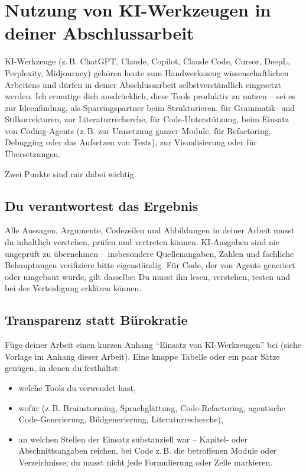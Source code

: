 \chapter{Nutzung von KI-Werkzeugen in deiner Abschlussarbeit}
\label{chap:ki-werkzeuge}

KI-Werkzeuge (z.\,B. ChatGPT, Claude, Copilot, Claude Code, Cursor, DeepL, Perplexity, Midjourney) gehören heute zum Handwerkszeug wissenschaftlichen Arbeitens und dürfen in deiner Abschlussarbeit selbstverständlich eingesetzt werden. Ich ermutige dich ausdrücklich, diese Tools produktiv zu nutzen -- sei es zur Ideenfindung, als Sparringspartner beim Strukturieren, für Grammatik- und Stilkorrekturen, zur Literaturrecherche, für Code-Unterstützung, beim Einsatz von Coding-Agents (z.\,B. zur Umsetzung ganzer Module, für Refactoring, Debugging oder das Aufsetzen von Tests), zur Visualisierung oder für Übersetzungen.

Zwei Punkte sind mir dabei wichtig.

\section{Du verantwortest das Ergebnis}

Alle Aussagen, Argumente, Codezeilen und Abbildungen in deiner Arbeit musst du inhaltlich verstehen, prüfen und vertreten können. KI-Ausgaben sind nie ungeprüft zu übernehmen -- insbesondere Quellenangaben, Zahlen und fachliche Behauptungen verifiziere bitte eigenständig. Für Code, der von Agents generiert oder umgebaut wurde, gilt dasselbe: Du musst ihn lesen, verstehen, testen und bei der Verteidigung erklären können.

\section{Transparenz statt Bürokratie}
\label{sec:ki-transparenz}

Füge deiner Arbeit einen kurzen Anhang \enquote{Einsatz von KI-Werkzeugen} bei (siehe Vorlage im Anhang dieser Arbeit). Eine knappe Tabelle oder ein paar Sätze genügen, in denen du festhältst:

\begin{itemize}
    \item[a)] welche Tools du verwendet hast,
    \item[b)] wofür (z.\,B. Brainstorming, Sprachglättung, Code-Refactoring, agentische Code-Generierung, Bildgenerierung, Literaturrecherche),
    \item[c)] an welchen Stellen der Einsatz substanziell war -- Kapitel- oder Abschnittsangaben reichen, bei Code z.\,B. die betroffenen Module oder Verzeichnisse; du musst nicht jede Formulierung oder Zeile markieren.
\end{itemize}

